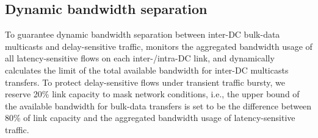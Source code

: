 %
%
%
%

\subsection{Dynamic bandwidth separation}
\label{subsec:system:separation}


To guarantee dynamic bandwidth separation between inter-DC
bulk-data multicasts and delay-sensitive traffic, \name
monitors the aggregated bandwidth usage of all
latency-sensitive flows on each inter-/intra-DC link, and dynamically
calculates the limit of the total available bandwidth for inter-DC multicasts transfers.
To protect delay-sensitive flows under transient traffic bursty,
we reserve 20\% link capacity to mask network conditions, 
i.e., the upper bound of the available bandwidth for bulk-data
transfers is set to be the difference between 80\% of
link capacity and the aggregated bandwidth usage of
latency-sensitive traffic.


